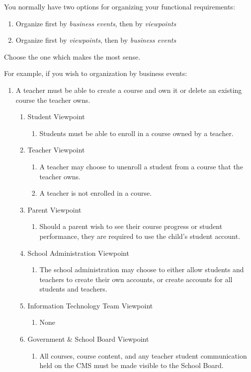 \documentclass[]{article}
\begin{document}
You normally have two options for organizing your functional requirements:
\begin{enumerate}
	\item Organize first by \emph{business events}, then by \emph{viewpoints}
	\item Organize first by \emph{viewpoints}, then by \emph{business events}
\end{enumerate}
Choose the one which makes the most sense.

For example, if you wish to organization by business events:

%
\begin{enumerate}[{BE}1.]
	\item A teacher must be able to create a course and own it or delete an 
existing course the teacher owns.
	\begin{enumerate}[{VP1}.1]
		\item Student Viewpoint
			\begin{enumerate}
				\item Students must be able to enroll in a course owned by a teacher.
			\end{enumerate}
		\item Teacher Viewpoint
			\begin{enumerate}
				\item A teacher may choose to unenroll a student from a course that the 
teacher owns.
				\item A teacher is not enrolled in a course.
			\end{enumerate}
		\item Parent Viewpoint
			\begin{enumerate}
				\item Should a parent wish to see their course progress or student 
performance, they are required to use the child's student account.
			\end{enumerate}
		\item School Administration Viewpoint
			\begin{enumerate}
				\item The school administration may choose to either allow students and 
teachers to create their own accounts, or create accounts for all students and 
teachers.
			\end{enumerate}
		\item Information Technology Team Viewpoint
			\begin{enumerate}
				\item None
			\end{enumerate}
		\item Government \& School Board Viewpoint
			\begin{enumerate}
				\item All courses, course content, and any teacher student communication 
held on the CMS must be made visible to the School Board.
			\end{enumerate}
	\end{enumerate}


\end{enumerate}
\end{document}
